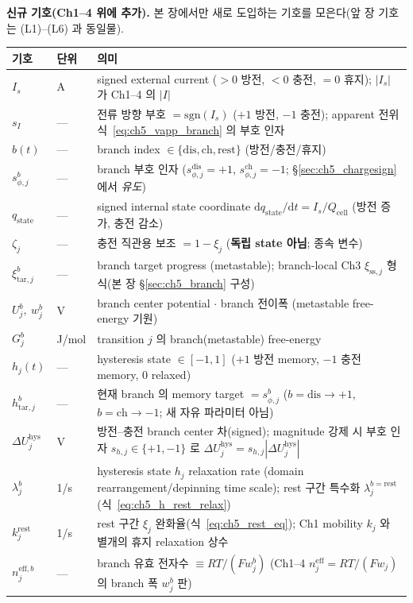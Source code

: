 \documentclass[11pt,a4paper]{article}
\newcommand{\dd}{\mathrm{d}}
\newcommand{\eff}{\mathrm{eff}}
\newcommand{\cell}{\mathrm{cell}}
\newcommand{\dis}{\mathrm{dis}}
\newcommand{\chg}{\mathrm{ch}}
\newcommand{\rst}{\mathrm{rest}}
\newcommand{\hys}{\mathrm{hys}}
\newcommand{\tar}{\mathrm{tar}}
\newcommand{\stt}{\mathrm{state}}
\newcommand{\sstat}{\mathrm{ss}}
\begin{document}
\textbf{신규 기호(Ch1--4 위에 추가).} 본 장에서만 새로 도입하는 기호를 모은다(앞 장 기호는 (L1)--(L6) 과 동일물).
\begin{longtable}{p{} p{} >{\raggedright\arraybackslash}p{}}
\toprule 기호 & 단위 & 의미 \\ \midrule \endhead
$I_s$ & A & signed external current ($>0$ 방전, $<0$ 충전, $=0$ 휴지); $|I_s|$ 가 Ch1--4 의 $|I|$ \\
$s_I$ & --- & 전류 방향 부호 $=\mathrm{sgn}(I_s)$ ($+1$ 방전, $-1$ 충전); apparent 전위 식~\eqref{eq:ch5_vapp_branch} 의 부호 인자 \\
$b(t)$ & --- & branch index $\in\{\dis,\chg,\rst\}$ (방전/충전/휴지) \\
$s_{\phi,j}^b$ & --- & branch 부호 인자 ($s_{\phi,j}^\dis=+1$, $s_{\phi,j}^\chg=-1$; \S\ref{sec:ch5_chargesign} 에서 \emph{유도}) \\
$q_\stt$ & --- & signed internal state coordinate $\dd q_\stt/\dd t=I_s/Q_\cell$ (방전 증가, 충전 감소) \\
$\zeta_j$ & --- & 충전 직관용 보조 $=1-\xi_j$ (\textbf{독립 state 아님}; 종속 변수) \\
$\xi_{\tar,j}^b$ & --- & branch target progress (metastable); branch-local Ch3 $\xi_{\sstat,j}$ 형식(본 장 \S\ref{sec:ch5_branch} 구성) \\
$U_j^b,\ w_j^b$ & V & branch center potential $\cdot$ branch 전이폭 (metastable free-energy 기원) \\
$G_j^b$ & J/mol & transition $j$ 의 branch(metastable) free-energy \\
$h_j(t)$ & --- & hysteresis state $\in[-1,1]$ ($+1$ 방전 memory, $-1$ 충전 memory, $0$ relaxed) \\
$h_{\tar,j}^b$ & --- & 현재 branch 의 memory target $=s_{\phi,j}^b$ ($b=\dis\to+1$, $b=\chg\to-1$; 새 자유 파라미터 아님) \\
$\Delta U_j^\hys$ & V & 방전--충전 branch center 차(signed); magnitude 강제 시 부호 인자 $s_{h,j}\in\{+1,-1\}$ 로 $\Delta U_j^\hys=s_{h,j}|\Delta U_j^\hys|$ \\
$\lambda_j^b$ & 1/s & hysteresis state $h_j$ relaxation rate (domain rearrangement/depinning time scale); rest 구간 특수화 $\lambda_j^{b=\rst}$ (식~\eqref{eq:ch5_h_rest_relax}) \\
$k_j^\rst$ & 1/s & rest 구간 $\xi_j$ 완화율(식~\eqref{eq:ch5_rest_eq}); Ch1 mobility $k_j$ 와 별개의 휴지 relaxation 상수 \\
$n_j^{\eff,b}$ & --- & branch 유효 전자수 $\equiv RT/(Fw_j^b)$ (Ch1--4 $n_j^\eff{=}RT/(Fw_j)$ 의 branch 폭 $w_j^b$ 판) \\

\end{longtable}
\end{document}
